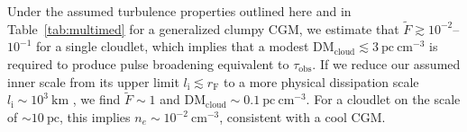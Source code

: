 \documentclass[twocolumn, linenumbers, tra]{aastex631}
\begin{document}
{%
Under the assumed turbulence properties outlined here and in Table~\ref{tab:multimed} for a generalized clumpy CGM, we estimate that $\widetilde{F} \gtrsim 10^{-2}$--$10^{-1}$ for a single cloudlet, which implies that a modest $\mathrm{DM}_{\mathrm{cloud}} \lesssim 3\ \mathrm{pc\ cm}^{-3}$ is required to produce pulse broadening equivalent to $\tau_{\mathrm{obs}}$.} If we reduce our assumed inner scale from its upper limit $l_\mathrm{i} \lesssim r_\mathrm{F}$ to a more physical dissipation scale $l_\mathrm{i} \sim 10^3\ \mathrm{km}$ \citep[e.g., the ion inertial scale or gyroradius in a cool CGM;][]{Ocker2025}, we find $\widetilde{F} \sim 1$ and $\mathrm{DM}_{\mathrm{cloud}} \sim 0.1\ \mathrm{pc\ cm}^{-3}$. For a cloudlet on the scale of $ \sim 10\ \mathrm{pc}$, this implies $n_e \sim 10^{-2}\ \mathrm{cm}^{-3}$, consistent with a cool CGM.  

\end{document}
